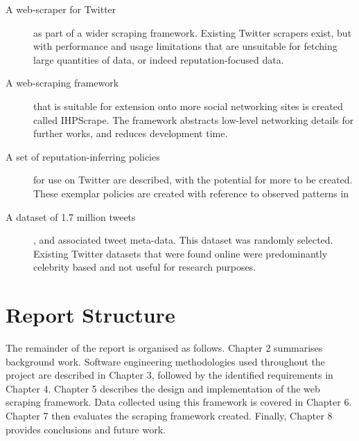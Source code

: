 \begin{description}
	\item [A web-scraper for Twitter] as part of a wider scraping framework. Existing Twitter scrapers exist, but with performance and usage limitations that are unsuitable for fetching large quantities of data, or indeed reputation-focused data.
	
	\item [A web-scraping framework] that is suitable for extension onto more social networking sites is created called IHPScrape. The framework abstracts low-level networking details for further works, and reduces development time.
	
	\item [A set of reputation-inferring policies] for use on Twitter are described, with the potential for more to be created. These exemplar policies are created with reference to observed patterns in 
	
	\item [A dataset of 1.7 million tweets], and associated tweet meta-data. This dataset was randomly selected. Existing Twitter datasets that were found online were predominantly celebrity based and not useful for research purposes. 
\end{description}

\section{Report Structure}

The remainder of the report is organised as follows. Chapter 2 summarises background work. Software engineering methodologies used throughout the project are described in Chapter 3, followed by the identified requirements in Chapter 4. Chapter 5 describes the design and implementation of the web scraping framework. Data collected using this framework is covered in Chapter 6. Chapter 7 then evaluates the scraping framework created. Finally, Chapter 8 provides conclusions and future work.


